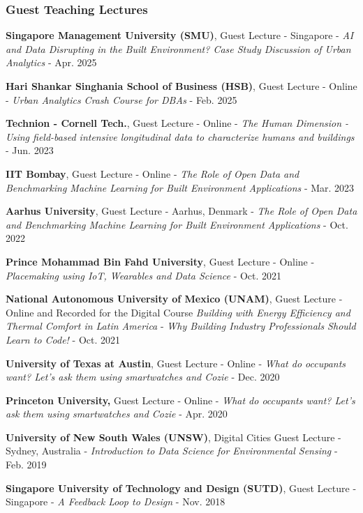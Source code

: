 \documentclass[10pt,a4paper]{article}
\begin{document}
\begin{small}
\subsubsection*{Guest Teaching Lectures}
\begin{etaremune}
\item
\textbf{Singapore Management University (SMU)}, Guest Lecture - Singapore - \emph{AI and Data Disrupting in the Built Environment? Case Study Discussion of Urban Analytics} - Apr. 2025
\item
\textbf{Hari Shankar Singhania School of Business (HSB)}, Guest Lecture - Online - \emph{Urban Analytics Crash Course for DBAs} - Feb. 2025
\item
\textbf{Technion - Cornell Tech.}, Guest Lecture - Online - \emph{The Human Dimension - Using field-based intensive longitudinal data to characterize humans and buildings} - Jun. 2023
\item
\textbf{IIT Bombay}, Guest Lecture - Online - \emph{The Role of Open Data and Benchmarking Machine Learning for Built Environment Applications} - Mar. 2023
\item
\textbf{Aarhus University}, Guest Lecture - Aarhus, Denmark - \emph{The Role of Open Data and Benchmarking Machine Learning for Built Environment Applications} - Oct. 2022
\item
\textbf{Prince Mohammad Bin Fahd University}, Guest Lecture - Online - \emph{Placemaking using IoT, Wearables and Data Science} - Oct. 2021
\item
\textbf{National Autonomous University of Mexico (UNAM)}, Guest Lecture - Online and Recorded for the Digital Course \emph{Building with Energy Efficiency and Thermal Comfort in Latin America} - \emph{Why Building Industry Professionals Should Learn to Code!} - Oct. 2021
\item
\textbf{University of Texas at Austin}, Guest Lecture - Online - \emph{What do occupants want? Let’s ask them using smartwatches and Cozie} - Dec. 2020
\item
\textbf{Princeton University,} Guest Lecture - Online - \emph{What do occupants want? Let’s ask them using smartwatches and Cozie} - Apr. 2020
\item
\textbf{University of New South Wales (UNSW)}, Digital Cities Guest Lecture - Sydney, Australia - \emph{Introduction to Data Science for Environmental Sensing} - Feb. 2019
\item
\textbf{Singapore University of Technology and Design (SUTD)}, Guest Lecture - Singapore - \emph{A Feedback Loop to Design} - Nov. 2018
\end{etaremune}



\end{small}
\end{document}
